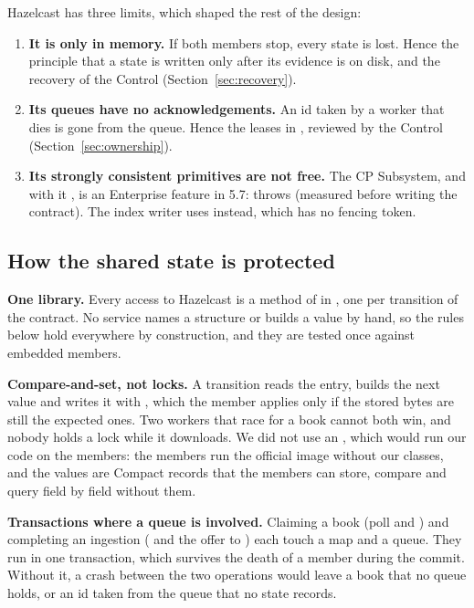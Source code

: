 Hazelcast has three limits, which shaped the rest of the design:
\begin{enumerate}
  \item \textbf{It is only in memory.} If both members stop, every state is lost. Hence the principle that a state is
    written only after its evidence is on disk, and the recovery of the Control (Section~\ref{sec:recovery}).
  \item \textbf{Its queues have no acknowledgements.} An id taken by a worker that dies is gone from the queue. Hence the
    leases in , reviewed by the Control (Section~\ref{sec:ownership}).
  \item \textbf{Its strongly consistent primitives are not free.} The CP Subsystem, and with it , is an
    Enterprise feature in 5.7:  throws  (measured
    before writing the contract). The index writer uses  instead, which has no fencing token.
\end{enumerate}

\subsection{How the shared state is protected}

\textbf{One library.} Every access to Hazelcast is a method of  in , one per
transition of the contract. No service names a structure or builds a value by hand, so the rules below hold
everywhere by construction, and they are tested once against embedded members.

\textbf{Compare-and-set, not locks.} A transition reads the entry, builds the next value and writes it with
, which the member applies only if the stored bytes are still the expected ones.
Two workers that race for a book cannot both win, and nobody holds a lock while it downloads. We did not use an
, which would run our code on the members: the members run the official image without our
classes, and the values are Compact records that the members can store, compare and query field by field without them.

\textbf{Transactions where a queue is involved.} Claiming a book (poll and ) and completing an
ingestion ( and the offer to ) each touch a map and a queue. They run in one
 transaction, which survives the death of a member during the commit. Without it, a crash between the
two operations would leave a book  that no queue holds, or an id taken from the queue that no state
records.

